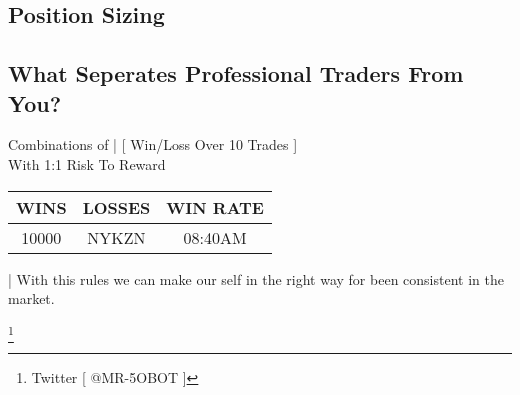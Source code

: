 \documentclass[10pt]{article}
\begin{document}
\newpage
\subsection*{Position Sizing}

\renewcommand{\arraystretch}{1.5} %
\setlength{\tabcolsep}{10pt} %

\subsection*{What Seperates Professional Traders From You?}
\vspace{0.3cm}
\begin{center}
  \small{Combinations of | [ Win/Loss Over 10 Trades ]} \\
  \small{With 1:1 Risk To Reward}
\end{center}

\begin{center}
\begin{tabular}{|c|c|c|}
  \hline
  WINS & LOSSES & WIN RATE \\ 
  \hline 
  10000 & NYKZN & 08:40AM \\  
  \hline
\end{tabular}
\end{center}
\vspace{0.1cm}


\begin{notesbox}
  \noindent | With this rules we can make our self in the right way for been consistent in the market.
\end{notesbox}


\footnote{Twitter [ @MR-5OBOT ]}
\end{document}
